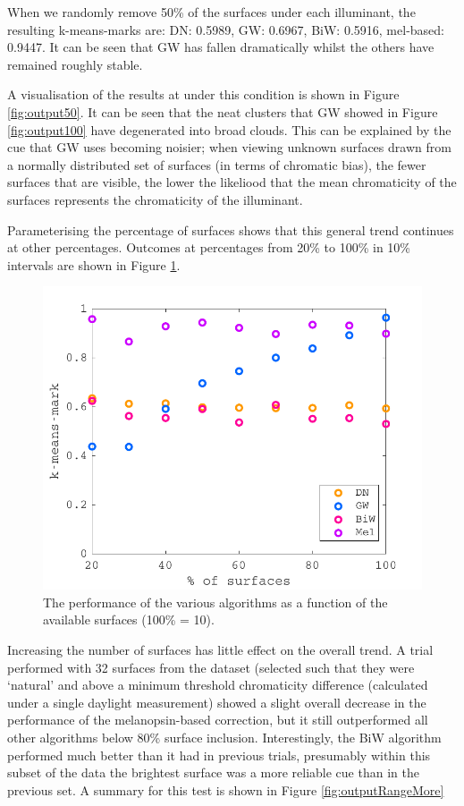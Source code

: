When we randomly remove 50\% of the surfaces under each illuminant, the resulting k-means-marks are: \gls{DN}: 0.5989, \gls{GW}: 0.6967, \gls{BiW}: 0.5916, mel-based: 0.9447. It can be seen that \gls{GW} has fallen dramatically whilst the others have remained roughly stable. 

A visualisation of the results at under this condition is shown in Figure \ref{fig:output50}. It can be seen that the neat clusters that \gls{GW} showed in Figure \ref{fig:output100} have degenerated into broad clouds. This can be explained by the cue that \gls{GW} uses becoming noisier; when viewing unknown surfaces drawn from a normally distributed set of surfaces (in terms of chromatic bias), the fewer surfaces that are visible, the lower the likeliood that the mean chromaticity of the surfaces represents the chromaticity of the illuminant. 

Parameterising the percentage of surfaces shows that this general trend continues at other percentages. Outcomes at percentages from 20\% to 100\% in 10\% intervals are shown in Figure \ref{fig:outputRange}.

\begin{figure}[htbp]
 \includegraphics[max width=\textwidth]{figs/comp/comparisonFourAlgos/outputRange.pdf}
 \caption{The performance of the various algorithms as a function of the available surfaces (100\% = 10).}
 \label{fig:outputRange}
\end{figure} 

Increasing the number of surfaces has little effect on the overall trend. A trial performed with 32 surfaces from the \citet{vrhel_measurement_1994} dataset (selected such that they were `natural' and above a minimum threshold chromaticity difference (calculated under a single daylight measurement) showed a slight overall decrease in the performance of the melanopsin-based correction, but it still outperformed all other algorithms below 80\% surface inclusion. Interestingly, the \gls{BiW} algorithm performed much better than it had in previous trials, presumably within this subset of the data the brightest surface was a more reliable cue than in the previous set. A summary for this test is shown in Figure \ref{fig:outputRangeMore}

